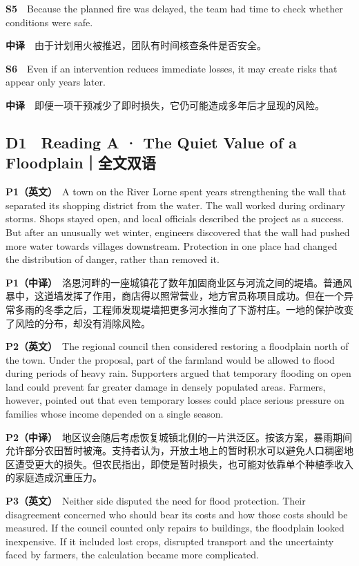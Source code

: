 \documentclass[
  11pt,
]{ctexart}
\begin{document}
\textbf{S5}　Because the planned fire was delayed, the team had time to
check whether conditions were safe.

\textbf{中译}　由于计划用火被推迟，团队有时间核查条件是否安全。

\textbf{S6}　Even if an intervention reduces immediate losses, it may
create risks that appear only years later.

\textbf{中译}　即便一项干预减少了即时损失，它仍可能造成多年后才显现的风险。

\subsection{D1　Reading A · The Quiet Value of a
Floodplain｜全文双语}\label{d1-reading-a-the-quiet-value-of-a-floodplainux5168ux6587ux53ccux8bed}

\textbf{P1（英文）}　A town on the River Lorne spent years strengthening
the wall that separated its shopping district from the water. The wall
worked during ordinary storms. Shops stayed open, and local officials
described the project as a success. But after an unusually wet winter,
engineers discovered that the wall had pushed more water towards
villages downstream. Protection in one place had changed the
distribution of danger, rather than removed it.

\textbf{P1（中译）}　洛恩河畔的一座城镇花了数年加固商业区与河流之间的堤墙。普通风暴中，这道墙发挥了作用，商店得以照常营业，地方官员称项目成功。但在一个异常多雨的冬季之后，工程师发现堤墙把更多河水推向了下游村庄。一地的保护改变了风险的分布，却没有消除风险。

\textbf{P2（英文）}　The regional council then considered restoring a
floodplain north of the town. Under the proposal, part of the farmland
would be allowed to flood during periods of heavy rain. Supporters
argued that temporary flooding on open land could prevent far greater
damage in densely populated areas. Farmers, however, pointed out that
even temporary losses could place serious pressure on families whose
income depended on a single season.

\textbf{P2（中译）}　地区议会随后考虑恢复城镇北侧的一片洪泛区。按该方案，暴雨期间允许部分农田暂时被淹。支持者认为，开放土地上的暂时积水可以避免人口稠密地区遭受更大的损失。但农民指出，即使是暂时损失，也可能对依靠单个种植季收入的家庭造成沉重压力。

\textbf{P3（英文）}　Neither side disputed the need for flood
protection. Their disagreement concerned who should bear its costs and
how those costs should be measured. If the council counted only repairs
to buildings, the floodplain looked inexpensive. If it included lost
crops, disrupted transport and the uncertainty faced by farmers, the
calculation became more complicated.
\end{document}

